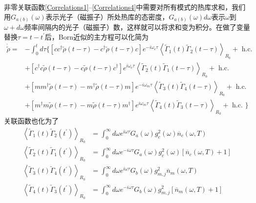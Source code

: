 非零关联函数\eqref{Correlations1}--\eqref{Correlations4}中需要对所有模式的热库求和，我们用$G_{a(b)}(\omega)$表示光子（磁振子）所处热库的态密度，$G_{a(b)}(\omega) d\omega$表示$\omega$到$\omega+d\omega$频率间隔内的光子（磁振子）数，这样就可以将求和变为积分。在做了变量替换$\tau = t-t^{\prime}$后，Born近似的主方程可以化简为
\begin{equation}
\begin{aligned}
\dot{\tilde{\rho}}={}&-\int_{0}^{t} d \tau \biggl\{\left[c c^{\dagger} \tilde{\rho}(t-\tau)-c^{\dagger} \tilde{\rho}(t-\tau) c\right] e^{-i \omega_{c} \tau}\left\langle\tilde{\Gamma}_1(t) \tilde{\Gamma}_2(t-\tau)\right\rangle_{R_0}+\text { h.c. }\\
&+\left[c^{\dagger} c \tilde{\rho}(t-\tau)-c \tilde{\rho}(t-\tau) c^{\dagger}\right] e^{i \omega_{c} \tau}\left\langle\tilde{\Gamma}_2(t) \tilde{\Gamma}_1(t-\tau)\right\rangle_{R_0}+\text { h.c. } \\
&+\left[m m^{\dagger} \tilde{\rho}(t-\tau)-m^{\dagger} \tilde{\rho}(t-\tau) m\right] e^{-i \omega_{m} \tau}\left\langle\tilde{\Gamma}_3(t) \tilde{\Gamma}_4(t-\tau)\right\rangle_{R_0}+\text { h.c. }\\
&+\left[m^{\dagger} m \tilde{\rho}(t-\tau)-m \tilde{\rho}(t-\tau) m^{\dagger}\right] e^{i \omega_{m} \tau}\left\langle\tilde{\Gamma}_4(t) \tilde{\Gamma}_3(t-\tau)\right\rangle_{R_0}+\text { h.c. } \biggr\}
\label{MasterEqBorn3}
\end{aligned}
\end{equation}
关联函数也化为了
\begin{align}
\left\langle\tilde{\Gamma}_{1}(t) \tilde{\Gamma}_{2}\left(t^{\prime}\right)\right\rangle_{R_0} &=\int_{0}^{\infty} d \omega e^{i \omega \tau} G_a(\omega) g_{c}^{2}(\omega) \overline{n}_c\left(\omega, T\right) \label{} \\
\left\langle\tilde{\Gamma}_{2}(t) \tilde{\Gamma}_{1}\left(t^{\prime}\right)\right\rangle_{R_0} &=\int_{0}^{\infty} d \omega e^{-i \omega \tau} G_a(\omega) g_{c}^{2}(\omega) \left[\overline{n}_c \left(\omega, T\right)+1\right] \\
\left\langle\tilde{\Gamma}_{3}(t) \tilde{\Gamma}_{4}\left(t^{\prime}\right)\right\rangle_{R_0} &=\int_{0}^{\infty} d \omega e^{i \omega \tau} G_b(\omega) g_{m,j}^{2} \overline{n}_m\left(\omega, T\right) \\
\left\langle\tilde{\Gamma}_{4}(t) \tilde{\Gamma}_{3}\left(t^{\prime}\right)\right\rangle_{R_0} &=\int_{0}^{\infty} d \omega e^{-i \omega \tau} G_b(\omega) g_{m,j}^{2} \left[\overline{n}_m\left(\omega, T\right)+1\right] \label{}
\end{align}
